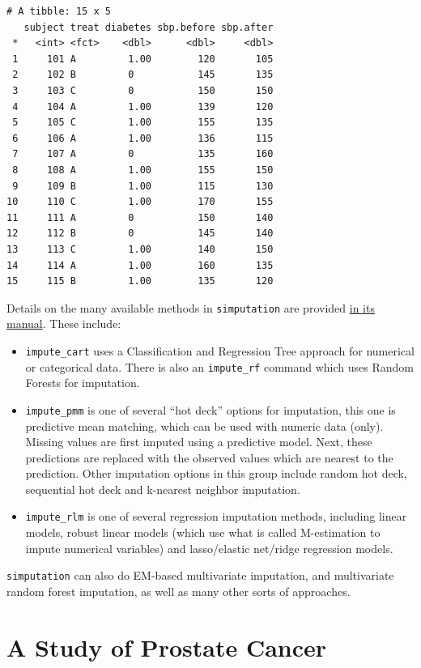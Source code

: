 \documentclass[]{book}
\providecommand{\tightlist}{%
  \setlength{\itemsep}{0pt}\setlength{\parskip}{0pt}}
\theoremstyle{definition}
\theoremstyle{definition}
\theoremstyle{definition}
\theoremstyle{remark}
\begin{document}
\begin{verbatim}
# A tibble: 15 x 5
   subject treat diabetes sbp.before sbp.after
 *   <int> <fct>    <dbl>      <dbl>     <dbl>
 1     101 A         1.00        120       105
 2     102 B         0           145       135
 3     103 C         0           150       150
 4     104 A         1.00        139       120
 5     105 C         1.00        155       135
 6     106 A         1.00        136       115
 7     107 A         0           135       160
 8     108 A         1.00        155       150
 9     109 B         1.00        115       130
10     110 C         1.00        170       155
11     111 A         0           150       140
12     112 B         0           145       140
13     113 C         1.00        140       150
14     114 A         1.00        160       135
15     115 B         1.00        135       120
\end{verbatim}

Details on the many available methods in \texttt{simputation} are
provided
\href{https://cran.r-project.org/web/packages/simputation/simputation.pdf}{in
its manual}. These include:

\begin{itemize}
\tightlist
\item
  \texttt{impute\_cart} uses a Classification and Regression Tree
  approach for numerical or categorical data. There is also an
  \texttt{impute\_rf} command which uses Random Forests for imputation.
\item
  \texttt{impute\_pmm} is one of several ``hot deck'' options for
  imputation, this one is predictive mean matching, which can be used
  with numeric data (only). Missing values are first imputed using a
  predictive model. Next, these predictions are replaced with the
  observed values which are nearest to the prediction. Other imputation
  options in this group include random hot deck, sequential hot deck and
  k-nearest neighbor imputation.
\item
  \texttt{impute\_rlm} is one of several regression imputation methods,
  including linear models, robust linear models (which use what is
  called M-estimation to impute numerical variables) and lasso/elastic
  net/ridge regression models.
\end{itemize}

\texttt{simputation} can also do EM-based multivariate imputation, and
multivariate random forest imputation, as well as many other sorts of
approaches.

\chapter{A Study of Prostate Cancer}\label{a-study-of-prostate-cancer}
\end{document}
